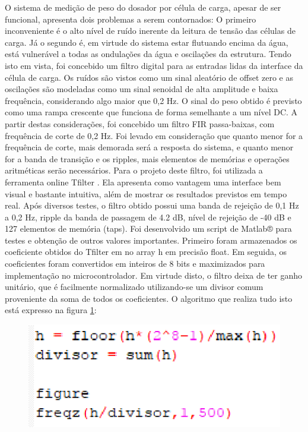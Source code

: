O sistema de medição de peso do dosador por célula de carga, apesar de ser funcional, apresenta dois problemas a serem contornados: O primeiro inconveniente é o alto nível de ruído inerente da leitura de tensão das células de carga. Já o segundo é, em virtude do sistema estar flutuando encima da água, está vulnerável a todas as ondulações da água e oscilações da estrutura.
Tendo isto em vista, foi concebido um filtro digital para as entradas lidas da interface da célula de carga. Os ruídos são vistos como um sinal aleatório de offset zero e as oscilações são modeladas como um sinal senoidal de alta amplitude e baixa frequência, considerando algo maior que 0,2 Hz. O sinal do peso obtido é previsto como uma rampa crescente que funciona de forma semelhante a um nível DC.
A partir destas considerações, foi concebido um filtro FIR passa-baixas, com frequência de corte de 0,2 Hz. Foi levado em consideração que quanto menor for a frequência de corte, mais demorada será a resposta do sistema, e quanto menor for a banda de transição e os ripples, mais elementos de memórias e operações aritméticas serão necessários.
Para o projeto deste filtro, foi utilizada a ferramenta online Tfilter \cite{tfilter}. Ela apresenta como vantagem uma interface bem visual e bastante intuitiva, além de mostrar os resultados previstos em tempo real. Após diversos testes, o filtro obtido possui uma banda de rejeição de 0,1 Hz a 0,2 Hz, ripple da banda de passagem de 4.2 dB, nível de rejeição de -40 dB e 127 elementos de memória (taps).
Foi desenvolvido um script de Matlab® para testes e obtenção de outros valores importantes. Primeiro foram armazenados os coeficiente obtidos do Tfilter em no array h em precisão float. Em seguida, os coeficientes foram convertidos em inteiros de 8 bits e maximizados para implementação no microcontrolador. Em virtude disto, o filtro deixa de ter ganho unitário, que é facilmente normalizado utilizando-se um divisor comum proveniente da soma de todos os coeficientes. O algoritmo que realiza tudo isto está expresso na figura \ref{rfreq}:

\begin{figure}[h]
	\centering
	\includegraphics[keepaspectratio=true,scale=0.9]{figuras/rfreq}
	\caption{}
	\label{rfreq}
\end{figure}

